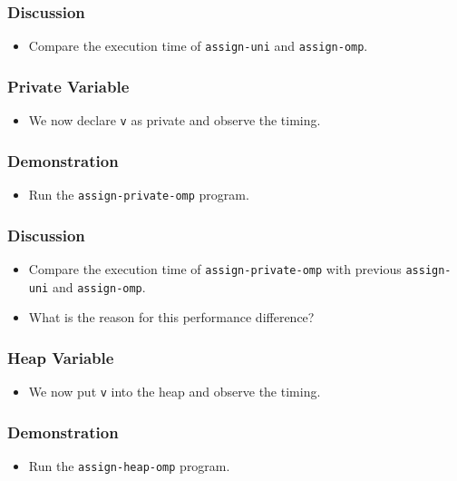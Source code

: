 \documentclass{beamer}
\begin{document}
\begin{frame}
  \frametitle{Discussion}
  \begin{itemize}
  \item Compare the execution time of {\tt assign-uni} and {\tt assign-omp}.
  \end{itemize}
\end{frame}


\begin{frame}
  \frametitle{Private Variable}
  \begin{itemize}
  \item We now declare {\tt v} as private and observe the timing.
  \end{itemize}
\end{frame}

\begin{frame}
\end{frame}

\begin{frame}
  \frametitle{Demonstration}
  \begin{itemize}
  \item Run the {\tt assign-private-omp} program.
  \end{itemize}
\end{frame}

\begin{frame}
  \frametitle{Discussion}
  \begin{itemize}
  \item Compare the execution time of {\tt assign-private-omp} with
    previous {\tt assign-uni} and {\tt assign-omp}.
    \item What is the reason for this performance difference?
  \end{itemize}
\end{frame}

\begin{frame}
  \frametitle{Heap Variable}
  \begin{itemize}
  \item We now put {\tt v} into the heap and observe the timing.
  \end{itemize}
\end{frame}

\begin{frame}
\end{frame}

\begin{frame}
  \frametitle{Demonstration}
  \begin{itemize}
  \item Run the {\tt assign-heap-omp} program.
  \end{itemize}
\end{frame}
\end{document}
